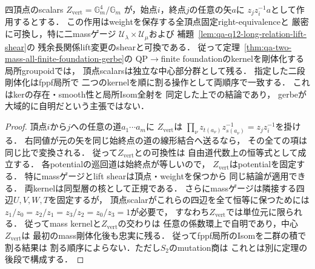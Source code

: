 \begin{lemma}[頂点scalarsの中心性と二段剛体化]
\label{lem:qa-q12-vertex-scalars-central}
四頂点のscalars
$Z_{\mathrm{vert}}=\mathbb G_m^4/\mathbb G_m$
が，始点$i$，終点$j$の任意の矢$a$に
$z_jz_i^{-1}a$として作用するとする．
この作用はweightを保存する全頂点固定right-equivalenceと
厳密に可換し，特に二massゲージ
$\mathcal U_\lambda\times\mathcal U_\mu$および
補題~\ref{lem:qa-q12-long-relation-lift-shear}の
残余長関係lift変更のshearと可換である．
従って定理~\ref{thm:qa-two-mass-all-finite-foundation-gerbe}の
QP$\to$finite foundationのkernelを剛体化する局所groupoidでは，
頂点scalarsは独立な中心部分群として残る．
指定した二段剛体化はfppf局所で
二つのkernelを順に割る操作として両順序で一致する．
これはkerの存在・smooth性と局所Isom全射を
同定した上での結論であり，
gerbeが大域的に自明だという主張ではない．
\end{lemma}
\begin{proof}
頂点$i$から$j$への任意の道$a_1\cdots a_m$に
$Z_{\mathrm{vert}}$は
$\prod_\nu z_{t(a_\nu)}z_{s(a_\nu)}^{-1}
=z_jz_i^{-1}$を掛ける．
右同値が元の矢を同じ始終点の道の線形結合へ送るなら，
その全ての項は同じ比で変換される．
従って$Z_{\mathrm{vert}}$との可換性は
自由道代数上の恒等式として成立する．
各potentialの巡回道は始終点が等しいので，
$Z_{\mathrm{vert}}$はpotentialを固定する．
特にmassゲージとlift shearは頂点・weightを保つから
同じ結論が適用できる．
両kernelは同型層の核として正規である．
さらにmassゲージは隣接する四辺$U,V,W,T$を固定するが，
頂点scalarがこれらの四辺を全て恒等に保つためには
$z_1/z_0=z_2/z_1=z_3/z_2=z_0/z_3=1$が必要で，
すなわち$Z_{\mathrm{vert}}$では単位元に限られる．
従ってmass kernelと$Z_{\mathrm{vert}}$の交わりは
任意の係数環上で自明であり，中心$Z_{\mathrm{vert}}$は
最初のmass剛体化後も忠実に残る．
従ってfppf局所のIsomを二群の積で割る結果は
割る順序によらない．ただし$S_2$のmutation商は
これとは別に定理の後段で構成する．
\end{proof}

